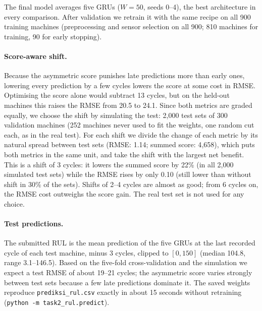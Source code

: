 The final model averages five GRUs ($W=50$, seeds 0--4), the best architecture in every
comparison. After validation we retrain it with the same recipe on all 900 training machines
(preprocessing and sensor selection on all 900; 810 machines for training, 90 for early stopping).

\paragraph{Score-aware shift.} Because the asymmetric score punishes late predictions more than
early ones, lowering every prediction by a few cycles lowers the score at some cost in RMSE.
Optimising the score alone would subtract 13 cycles, but on the held-out machines this raises the
RMSE from 20.5 to 24.1. Since both metrics are graded equally, we choose the shift by simulating
the test: 2{,}000 test sets of 300 validation machines (252 machines never used to fit the weights,
one random cut each, as in the real test). For each shift we divide the change of each metric by
its natural spread between test sets (RMSE: 1.14; summed score: 4{,}658), which puts both metrics
in the same unit, and take the shift with the largest net benefit. This is a shift of 3 cycles:
it lowers the summed score by 22\% (in all 2{,}000 simulated test sets) while the RMSE rises by
only 0.10 (still lower than without shift in 30\% of the sets). Shifts of 2--4 cycles are almost as
good; from 6 cycles on, the RMSE cost outweighs the score gain. The real test set is not used for
any choice.

\paragraph{Test predictions.} The submitted RUL is the mean prediction of the five GRUs at the last
recorded cycle of each test machine, minus 3 cycles, clipped to $[0,150]$ (median 104.8, range
3.1--146.5). Based on the five-fold cross-validation and the simulation we expect a test RMSE of
about 19--21 cycles; the asymmetric score varies strongly between test sets because a few late
predictions dominate it. The saved weights reproduce \texttt{prediksi\_rul.csv} exactly in about
15 seconds without retraining (\texttt{python -m task2\_rul.predict}).
